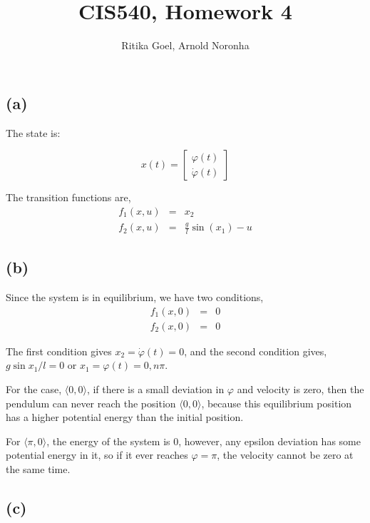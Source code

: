 \documentclass{article}
\begin{document}
\title{CIS540, Homework 4}\author{Ritika Goel, Arnold Noronha
}

\maketitle

\section{}

\subsection*{(a)}

The state is:

$$ x(t) = \left[ \begin{array}{cc}
\varphi(t) \\
\dot{\varphi}(t)
\end{array}
\right]$$

The transition functions are, 
\begin{eqnarray}
 f_1 (x, u) &=& x_2 \\
 f_2 (x, u) &=& \frac{g}{l} \sin(x_1) - u
\end{eqnarray} 

\subsection*{(b)}

Since the system is in equilibrium, we have two conditions, 
\begin{eqnarray}
f_1 (x, 0) &=& 0 \\
f_2 (x, 0) &=& 0 
\end{eqnarray}

The first condition gives $x_2 = \dot{\varphi}(t) = 0$, and the second
condition gives, $g\sin x_1 /l = 0$ or $x_1 = \varphi(t) = 0, n\pi$.

For the case, $\langle 0, 0\rangle$, if there is a small deviation in
$\varphi$ and velocity is zero, then the pendulum can never reach the
position $\langle 0,0\rangle$, because this equilibrium position has
a higher potential energy than the initial position.

For $\langle \pi, 0\rangle$, the energy of the system is 0, however, any
epsilon deviation has some potential energy in it, so if it ever
reaches $\varphi = \pi$, the velocity cannot be zero at the same time.

\subsection*{(c)}
\end{document}
